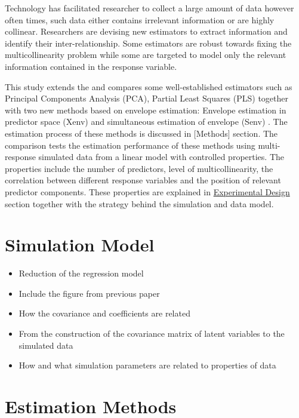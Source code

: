 \documentclass[12pt,3p,authoryear]{elsarticle}
\providecommand{\tightlist}{%
  \setlength{\itemsep}{0pt}\setlength{\parskip}{0pt}}
\begin{document}
Technology has facilitated researcher to collect a large amount of data
however often times, such data either contains irrelevant information or
are highly collinear. Researchers are devising new estimators to extract
information and identify their inter-relationship. Some estimators are
robust towards fixing the multicollinearity problem while some are
targeted to model only the relevant information contained in the
response variable.

This study extends the \citep{rimal2019pred} and compares some
well-established estimators such as Principal Components Analysis (PCA),
Partial Least Squares (PLS) together with two new methods based on
envelope estimation: Envelope estimation in predictor space (Xenv)
\citep{cook2010envelope} and simultaneous estimation of envelope (Senv)
\citep{cook2015simultaneous}. The estimation process of these methods is
discussed in {[}Methods{]} section. The comparison tests the estimation
performance of these methods using multi-response simulated data from a
linear model with controlled properties. The properties include the
number of predictors, level of multicollinearity, the correlation
between different response variables and the position of relevant
predictor components. These properties are explained in
\protect\hyperlink{experimental-design}{Experimental Design} section
together with the strategy behind the simulation and data model.

\section{Simulation Model}\label{simulation-model}

\begin{itemize}
\tightlist
\item
  Reduction of the regression model
\item
  Include the figure from previous paper
\item
  How the covariance and coefficients are related
\item
  From the construction of the covariance matrix of latent variables to
  the simulated data
\item
  How and what simulation parameters are related to properties of data
\end{itemize}

\section{Estimation Methods}\label{estimation-methods}
\end{document}
